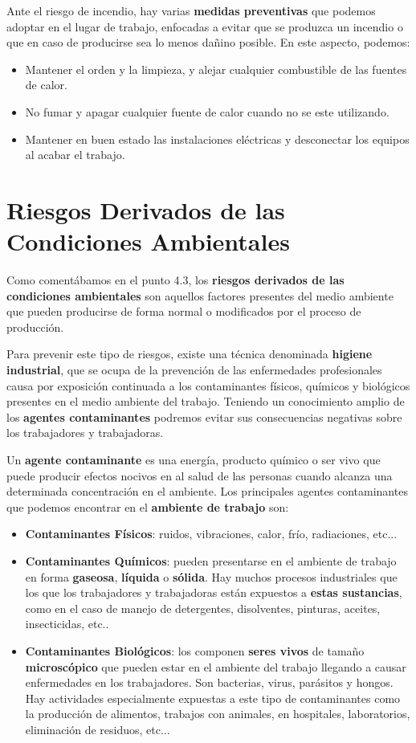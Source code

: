 Ante el riesgo de incendio, hay varias \textbf{medidas preventivas} que podemos adoptar en el lugar de trabajo, enfocadas a evitar que se produzca un incendio o que en caso de producirse sea lo menos dañino posible. En este aspecto, podemos:

\begin{itemize}
    \item Mantener el orden y la limpieza, y alejar cualquier combustible de las fuentes de calor.
    \item No fumar y apagar cualquier fuente de calor cuando no se este utilizando.
    \item Mantener en buen estado las instalaciones eléctricas y desconectar los equipos al acabar el trabajo.
\end{itemize}

\section{Riesgos Derivados de las Condiciones Ambientales}
Como comentábamos en el punto 4.3, los \textbf{riesgos derivados de las condiciones ambientales} son aquellos factores presentes del medio ambiente que pueden producirse de forma normal o modificados por el proceso de producción.

Para prevenir este tipo de riesgos, existe una técnica denominada \textbf{higiene industrial}, que se ocupa de la prevención de las enfermedades profesionales causa por exposición continuada a los contaminantes físicos, químicos y biológicos presentes en el medio ambiente del trabajo. Teniendo un conocimiento amplio de los \textbf{agentes contaminantes} podremos evitar sus consecuencias negativas sobre los trabajadores y trabajadoras.

Un \textbf{agente contaminante} es una energía, producto químico o ser vivo que puede producir efectos nocivos en al salud de las personas cuando alcanza una determinada concentración en el ambiente. Los principales agentes contaminantes que podemos encontrar en el \textbf{ambiente de trabajo} son:

\begin{itemize}
    \item \textbf{Contaminantes Físicos}: ruidos, vibraciones, calor, frío, radiaciones, etc...
    \item \textbf{Contaminantes Químicos}: pueden presentarse en el ambiente de trabajo en forma \textbf{gaseosa}, \textbf{líquida} o \textbf{sólida}. Hay muchos procesos industriales que los que los trabajadores y trabajadoras están expuestos a \textbf{estas sustancias}, como en el caso de manejo de detergentes, disolventes, pinturas, aceites, insecticidas, etc..
    \item \textbf{Contaminantes Biológicos}: los componen \textbf{seres vivos} de tamaño \textbf{microscópico} que pueden estar en el ambiente del trabajo llegando a causar enfermedades en los trabajadores. Son bacterias, virus, parásitos y hongos. Hay actividades especialmente expuestas a este tipo de contaminantes como la producción de alimentos, trabajos con animales, en hospitales, laboratorios, eliminación de residuos, etc...
\end{itemize}

